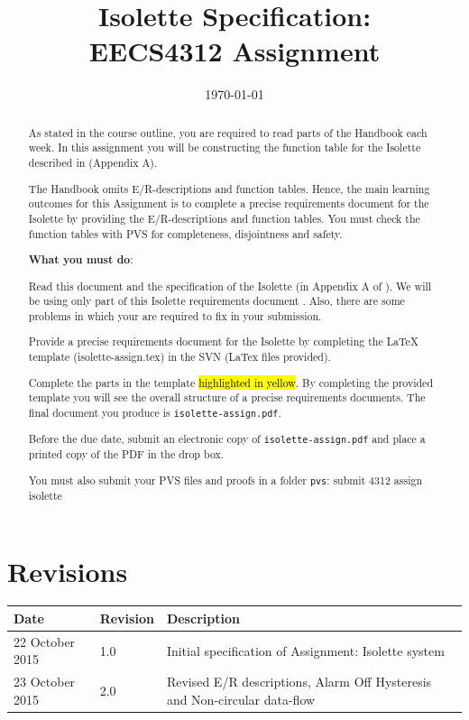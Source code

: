 \documentclass[fontsize=12pt,paper=letter,twoside]{scrartcl}
\title{Isolette Specification:\\ EECS4312 Assignment}
\date{\today} %
\begin{document}
\maketitle

\begin{abstract}
As stated in the course outline, you are required to read parts of  the Handbook \cite{REMH}  each week. In this assignment you will be constructing the function table for the Isolette described in \cite{REMH} (Appendix A). 

The Handbook omits E/R-descriptions and function  tables. Hence, the main learning outcomes for this Assignment is to complete a precise requirements document for the Isolette by providing the E/R-descriptions and function tables. You must check the function tables with PVS for completeness, disjointness and safety.

\textbf{What you must do}:

\begin{mylist}
\item Read this document and the  specification of the Isolette (in Appendix A of \cite{REMH}). We will be using only part of this Isolette requirements document \cite{REMH}. Also, there are some problems in \cite{REMH} which your are required to fix in your submission.
\item Provide a precise requirements document for the Isolette by completing the LaTeX template (isolette-assign.tex) in the SVN (LaTex files provided).
\item Complete the parts in the template \hl{highlighted in yellow}. By completing the provided template you will see the overall structure of a precise requirements documents. The final document you produce is \texttt{isolette-assign.pdf}.
\item Before the due date, submit an electronic copy of \texttt{isolette-assign.pdf} and place a printed copy of the PDF in the drop box.
\item You must also submit your PVS files and proofs in a folder \texttt{pvs}: submit 4312 assign isolette
\end{mylist}

\end{abstract}

\section*{Revisions}
\small
\begin{tabular}{|l|l|p{4in}|}
\hline
Date & Revision& Description \\ 
\hline
22 October  2015 
& 1.0       
& Initial specification of Assignment: Isolette system\\ 
\hline
23 October 2015 & 2.0 & Revised E/R descriptions,  Alarm Off Hysteresis and Non-circular data-flow\\
\hline
\end{tabular}
\end{document}
